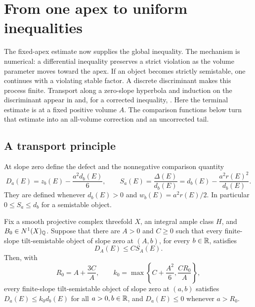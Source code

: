 \section{From one apex to uniform inequalities}
\label{sec:wall}

The fixed-apex estimate now supplies the global inequality.  The
mechanism is numerical: a differential inequality preserves a strict
violation as the volume parameter moves toward the apex.  If an object
becomes strictly semistable, one continues with a violating stable
factor.  A discrete discriminant makes this process finite.
Transport along a zero-slope hyperbola and induction on the
discriminant appear in \cite[Section~5]{BMS2016} and, for a corrected
inequality, \cite[Lemma~2.7]{BMSZ2017}.  Here the terminal estimate is
at a fixed positive volume $A$.  The comparison functions below turn
that estimate into an all-volume correction and an uncorrected tail.

\subsection{A transport principle}

At slope zero define the defect and the nonnegative comparison quantity
\begin{equation}\label{eq:wall-defect}
 D_a(E)=z_b(E)-\frac{a^2d_b(E)}6,\qquad
 S_a(E)=\frac{\Delta(E)}{d_b(E)}
       =d_b(E)-\frac{a^2r(E)^2}{d_b(E)}.
\end{equation}
They are defined whenever $d_b(E)>0$ and $w_b(E)=a^2r(E)/2$.
In particular $0\le S_a\le d_b$ for a semistable object.

\begin{proposition}\label{prop:apex-transport}
Fix a smooth projective complex threefold $X$, an integral ample class
$H$, and $B_0\in N^1(X)_{\mathbb Q}$.  Suppose that there are $A>0$ and
$C\ge0$ such that every finite-slope tilt-semistable object of slope
zero at $(A,b)$, for every $b\in\mathbb R$, satisfies
\begin{equation}\label{eq:wall-apex-input}
 D_A(E)\le C S_A(E).
\end{equation}
Then, with
\begin{equation}\label{eq:wall-constants}
 R_0=A+\frac{3C}{A},\qquad
 k_0=\max\left\{C+\frac{A^2}{6},\frac{CR_0}{A}\right\},
\end{equation}
every finite-slope tilt-semistable object of slope zero at $(a,b)$
satisfies $D_a(E)\le k_0d_b(E)$ for all $a>0,b\in\mathbb R$, and
$D_a(E)\le0$ whenever $a>R_0$.
\end{proposition}

